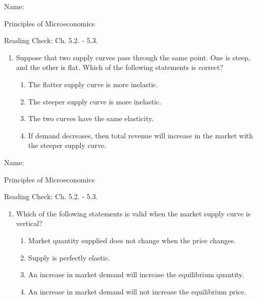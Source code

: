 \documentclass{article}
\begin{document}
\bigskip

Name: \underline{\phantom{xxxxxxxxxxxxxxxxxxxxxxxxxxxxxxxxxxxxxxxx}}

Principles of Microeconomics

Reading Check: Ch. 5.2. - 5.3.

\begin{enumerate}

\item Suppose that two supply curves pass through the same point. One is steep, and the other is flat. Which of the following statements is correct?

	\begin{enumerate}
	
	\item The flatter supply curve is more inelastic. 
	
	\item The steeper supply curve is more inelastic.
	
	\item The two curves have the same elasticity.
	
	\item If demand decreases, then total revenue will increase in the market with the steeper supply curve.
	
	\end{enumerate}
	
\end{enumerate}

\bigskip

Name: \underline{\phantom{xxxxxxxxxxxxxxxxxxxxxxxxxxxxxxxxxxxxxxxx}}

Principles of Microeconomics

Reading Check: Ch. 5.2. - 5.3.

\begin{enumerate}

\item Which of the following statements is valid when the market supply curve is vertical?

	\begin{enumerate}
	
	\item Market quantity supplied does not change when the price changes.
	
	\item Supply is perfectly elastic.
	
	\item An increase in market demand will increase the equilibrium quantity.
	
	\item An increase in market demand will not increase the equilibrium price.
	
	\end{enumerate}
	
\end{enumerate}
\end{document}
